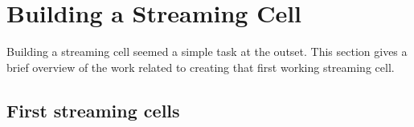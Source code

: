 




\section{Building a Streaming Cell}

  Building a streaming cell seemed a simple task at the outset.
  This section gives a brief overview of the work related to creating that first working streaming cell.

  \subsection{First streaming cells}

